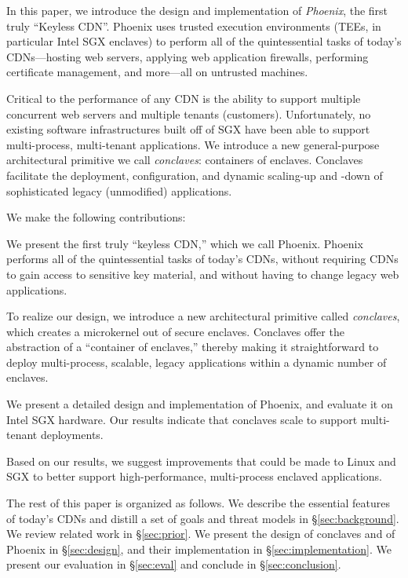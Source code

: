 In this paper, we introduce the design and implementation of
\emph{Phoenix}, the first truly ``Keyless CDN''.
%
Phoenix uses trusted execution environments (TEEs, in particular Intel
SGX enclaves) to perform all of the quintessential tasks of today's
CDNs---hosting web servers, applying web application firewalls,
performing certificate management, and more---all on untrusted
machines.


Critical to the performance of any CDN is the ability to support
multiple concurrent web servers and multiple tenants (customers).
%
Unfortunately, no existing software infrastructures built off of SGX
have been able to support multi-process, multi-tenant applications.
%
We introduce a new general-purpose architectural primitive we call
\emph{conclaves}: containers of enclaves.
%
Conclaves facilitate the deployment, configuration, and dynamic
scaling-up and -down of sophisticated legacy (unmodified) applications.


%
We make the following contributions:

\begin{widelist}

\item We present the first truly ``keyless CDN,'' which we call Phoenix.
	Phoenix performs all of the quintessential tasks of today's CDNs,
	without requiring CDNs to gain access to sensitive key material,
	and without having to change legacy web applications.

\item To realize our design, we introduce a new architectural primitive
	called \emph{conclaves}, which creates a microkernel out of secure
	enclaves.  Conclaves offer the abstraction of a ``container of
	enclaves,'' thereby making it straightforward to deploy
	multi-process, scalable, legacy applications within a dynamic
	number of enclaves.

\item We present a detailed design and implementation of Phoenix, and
	evaluate it on Intel SGX hardware. Our results indicate that
	conclaves scale to support multi-tenant deployments.

\item Based on our results, we suggest improvements that could be made
	to Linux and SGX to better support high-performance, multi-process
	enclaved applications.


\end{widelist}

%
The rest of this paper is organized as follows.
%
We describe the essential features of today's CDNs and distill a set of
goals and threat models in \S\ref{sec:background}.
%
We review related work in \S\ref{sec:prior}.
%
We present the design of conclaves and of Phoenix in \S\ref{sec:design},
and their implementation in \S\ref{sec:implementation}.
%
We present our evaluation in \S\ref{sec:eval} and conclude in
\S\ref{sec:conclusion}.



